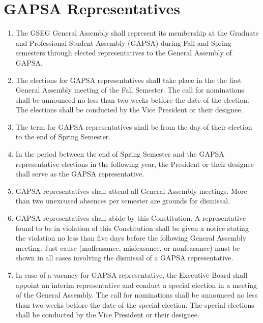 \chapter{GAPSA Representatives}
\label{art:gapsa-reps}

\begin{enumerate}[label=\Alph*.]
\item The GSEG General Assembly shall represent its membership at the Graduate and Professional Student Assembly (GAPSA) during Fall and Spring semesters through elected representatives to the General Assembly of GAPSA. 
\item The elections for GAPSA representatives shall take place in the the first General Assembly
meeting of the Fall Semester. The call for nominations shall be announced no less than two weeks 
betfore the date of the election. The elections shall be conducted by the Vice President or their
designee. 
\item The term for GAPSA representatives shall be from the day of their election to the end of 
Spring Semester. 
\item In the period between the end of Spring Semester and the GAPSA representative elections in the following year, the President or their designee shall serve as the GAPSA representative. 

\item GAPSA representatives shall attend all General Assembly meetings. More than two unexcused
absences per semester are grounds for dismissal. 

\item GAPSA representatives shall abide by this Constitution. A representative found to be in violation of this Constitution shall be given a notice stating the violation no less than five days before the following General Assembly meeting. Just cause (malfeasance, misfeasance, or nonfeasance) must be shown in all cases involving the dismissal of a GAPSA representative.

\item In case of a vacancy for GAPSA representative, the Executive Board shall appoint an interim
representative and conduct a special election in a meeting of the General Assembly. The call for
nominations shall be announced no less than two weeks betfore the date of the special election.
The special elections shall be conducted by the Vice President or their designee. 
\end{enumerate}